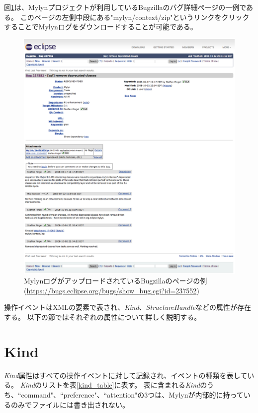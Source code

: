 \documentclass[a4paper]{jsbook}
\begin{document}
図\ref{bugzilla_webpage}は、Mylynプロジェクトが利用しているBugzillaのバグ詳細ページの一例である。
このページの左側中段にある"mylyn/context/zip"というリンクをクリックすることでMylynログをダウンロードすることが可能である。

\begin{figure}[tb]
  \centering
  \includegraphics[width = \linewidth]{resource/bugzilla_webpage.png}
  \caption{MylynログがアップロードされているBugzillaのページの例 (\url{https://bugs.eclipse.org/bugs/show_bug.cgi?id=237552})}
  \label{bugzilla_webpage}
\end{figure}


操作イベントはXMLの要素で表され、{\it Kind}、{\it StructureHandle}などの属性が存在する。
以下の節ではそれぞれの属性について詳しく説明する。

\section{Kind}\label{kind_sec}
{\it Kind}属性はすべての操作イベントに対して記録され、イベントの種類を表している。
{\it Kind}のリストを表\ref{kind_table}に表す。
表に含まれる{\it Kind}のうち、``command"、``preference"、``attention"の3つは、Mylynが内部的に持っているのみでファイルには書き出されない。
\end{document}
